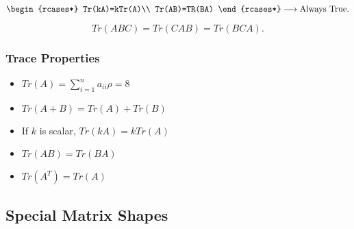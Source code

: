 \documentclass{article}
\begin{document}
\begin{note}
    \[
        \begin{rcases*}
            Tr(kA)=kTr(A)\\
            Tr(AB)=TR(BA)
        \end{rcases*}
        \longrightarrow
        \text{Always True}
    .\]
\end{note}

\[
    Tr(ABC)=Tr(CAB)=Tr(BCA)
.\] 

\subsubsection{Trace Properties}

\begin{itemize}
    \item $Tr(A)=\sum_{i=1}^n a_{i i} \rho=8$
    \item $Tr(A+B)=Tr(A)+Tr(B)$
    \item If $k$ is scalar, $Tr(kA)=k Tr(A)$
    \item $Tr(A B)=Tr(B A)$
    \item $Tr(A^T)=Tr(A)$
\end{itemize}

\subsection{Special Matrix Shapes}
\end{document}
